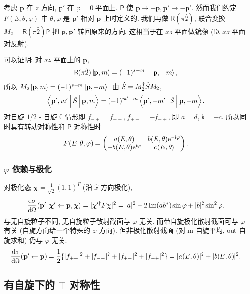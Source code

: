 考虑 $\mathbf{p}$ 在 $z$ 方向, $\mathbf{p}'$ 在 $\varphi=0$ 平面上. $\mathsf{P}$ 使 $\mathbf{p}\to -\mathbf{p},\mathbf{p}'\to -\mathbf{p}'$. 然而我们约定 $F(E,\theta,\varphi)$ 中 $\theta,\varphi$ 是 $\mathbf{p}'$ 相对 $\mathbf{p}$ 上时定义的. 我们再做 $\mathsf{R}(\pi\hat{2})$, 联合变换 $M_2=\mathsf{R}(\pi\hat{2})\mathsf{P}$ 把 $\mathbf{p},\mathbf{p}'$ 转回原来的方向. 这相当于在 $xz$ 平面做镜像 (以 $xz$ 平面对反射).

可以证明: 对 $xz$ 平面上的 $\mathbf{p}$,
\[
\mathsf{R}(\pi\hat{2})\ket{\mathbf{p},m}=(-1)^{s-m}\ket{-\mathbf{p},-m},
\]
所以 $M_2\ket{\mathbf{p},m}=(-1)^{s-m}\ket{\mathbf{p},-m}$. 由 $\hat{S}=M_2^\dagger \hat{S} M_2$,
\[
\left\langle \mathbf{p}',m' \,\middle|\, \hat{S} \,\middle|\, \mathbf{p},m \right\rangle=(-1)^{m'-m}\left\langle \mathbf{p}',-m' \,\middle|\, \hat{S} \,\middle|\, \mathbf{p},-m \right\rangle.
\]
对自旋 $1/2$ - 自旋 $0$ 情形即 $f_{++}=f_{--}$, $f_{+-}=-f_{-+}$, 即 $a=d$, $b=-c$. 所以同时具有转动对称性和 $\mathsf{P}$ 对称性时
\begin{equation}
F(E,\theta,\varphi)=\begin{pmatrix}a(E,\theta)& b(E,\theta)\mathrm{e}^{-\mathrm{i} \varphi}\\ -b(E,\theta)\mathrm{e}^{\mathrm{i} \varphi}& a(E,\theta)\end{pmatrix}.
\end{equation}

\subsubsection*{$\varphi$ 依赖与极化}

对极化态 $\bm{\chi}=\frac{1}{\sqrt{2}}(1,1)^T$ (沿 $\hat{x}$ 方向极化),
\begin{equation}
\frac{\mathrm{d}\sigma}{\mathrm{d}\Omega}(\mathbf{p}',\bm{\chi}'\leftarrow \mathbf{p},\bm{\chi})=|\bm{\chi}'^\dagger F\bm{\chi}|^2=|a|^2-2\,\mathrm{Im}(ab^*)\sin\varphi+|b|^2\sin^2\varphi.
\end{equation}
与无自旋粒子不同, 无自旋粒子散射截面与 $\varphi$ 无关, 而带自旋极化散射截面可与 $\varphi$ 有关 (自旋方向给一个特殊的 $\varphi$ 方向). 但非极化散射截面 (对 in 自旋平均, out 自旋求和) 仍与 $\varphi$ 无关:
\begin{equation}
\frac{\mathrm{d}\sigma}{\mathrm{d}\Omega}(\mathbf{p}'\leftarrow \mathbf{p})=\frac{1}{2}\{|f_{++}|^2+|f_{--}|^2+|f_{+-}|^2+|f_{-+}|^2\}=|a(E,\theta)|^2+|b(E,\theta)|^2.
\end{equation}

\subsection{有自旋下的 \texorpdfstring{$\mathsf{T}$}{T} 对称性}

